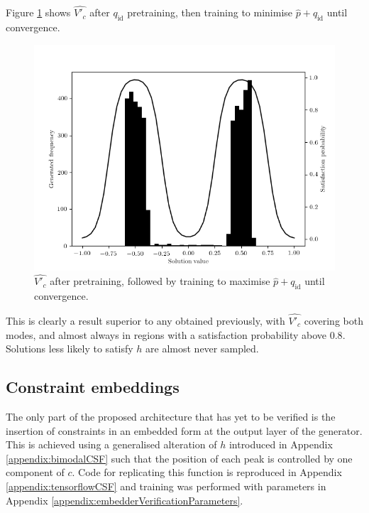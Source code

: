 \documentclass[../../main.tex]{subfiles}
\begin{document}
Figure \ref{fig:identityAndPrecision} shows $\hat{V'_c}$ after $q_\text{id}$ pretraining, then training to minimise $\hat{p}+q_\text{id}$ until convergence.
\begin{figure}[H]
    \begin{center}
    \includegraphics[width=\textwidth]{identityAndPrecision}
    \caption{
        $\hat{V'_c}$ after pretraining, followed by training to maximise $\hat{p}+q_\text{id}$ until convergence.
    }
    \label{fig:identityAndPrecision}
    \end{center}
\end{figure}
This is clearly a result superior to any obtained previously, with $\hat{V'_c}$ covering both modes, and almost always in regions with a satisfaction probability above $0.8$.
Solutions less likely to satisfy $h$ are almost never sampled.

\subsection{Constraint embeddings} \label{subsection:constraintEmbeddings}

The only part of the proposed architecture that has yet to be verified is the insertion of constraints in an embedded form at the output layer of the generator.
This is achieved using a generalised alteration of $h$ introduced in Appendix \ref{appendix:bimodalCSF} such that the position of each peak is controlled by one component of $c$.
Code for replicating this function is reproduced in Appendix \ref{appendix:tensorflowCSF} and training was performed with parameters in Appendix \ref{appendix:embedderVerificationParameters}.
\end{document}
